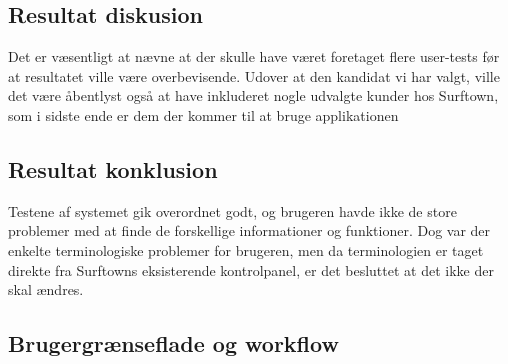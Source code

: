 \documentclass[12pt]{article}
\begin{document}
\subsection*{Resultat diskusion}
Det er væsentligt at nævne at der skulle have været foretaget flere user-tests før at resultatet ville være overbevisende. Udover at den kandidat vi har valgt, ville det være åbentlyst også at have inkluderet nogle udvalgte kunder hos Surftown, som i sidste ende er dem der kommer til at bruge applikationen 

\subsection*{Resultat konklusion}
Testene af systemet gik overordnet godt, og brugeren havde ikke de store problemer med at finde de forskellige informationer og funktioner. Dog var der enkelte terminologiske problemer for brugeren, men da terminologien er taget direkte fra Surftowns eksisterende kontrolpanel, er det besluttet at det ikke der skal ændres. 

\subsection{Brugergrænseflade og workflow}
\end{document}
